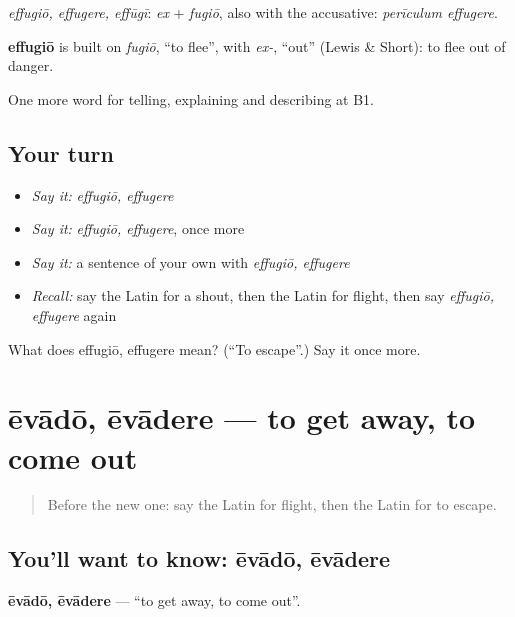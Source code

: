 \emph{effugiō, effugere, effūgī}: \emph{ex} + \emph{fugiō}, also with the accusative: \emph{perīculum effugere}.

\begin{cousinweb}
\textbf{effugiō} is built on \emph{fugiō}, \textquotedblleft{}to flee\textquotedblright{}, with \emph{ex-}, \textquotedblleft{}out\textquotedblright{} (Lewis \& Short): to flee out of danger.
\end{cousinweb}

\begin{grammarlens}[title={What you've built}]
One more word for telling, explaining and describing at B1.
\end{grammarlens}

\subsection*{Your turn}
\begin{itemize}
\raggedright
  \item \emph{Say it:} \emph{effugiō, effugere}
  \item \emph{Say it:} \emph{effugiō, effugere}, once more
  \item \emph{Say it:} a sentence of your own with \emph{effugiō, effugere}
  \item \emph{Recall:} say the Latin for a shout, then the Latin for flight, then say \emph{effugiō, effugere} again
\end{itemize}

\begin{tcolorbox}[breakable,colback=teal!4,colframe=teal!35!black,title={Before you move on}]
What does effugiō, effugere mean? (\textquotedblleft{}To escape\textquotedblright{}.) Say it once more.
\end{tcolorbox}
\section[ēvādō, ēvādere]{ēvādō, ēvādere — to get away, to come out}

\label{lesson:LA-C322-evado}



\begin{quote}
Before the new one: say the Latin for flight, then the Latin for to escape.
\end{quote}

\subsection*{You'll want to know: ēvādō, ēvādere}
\textbf{ēvādō, ēvādere} — \textquotedblleft{}to get away, to come out\textquotedblright{}.

